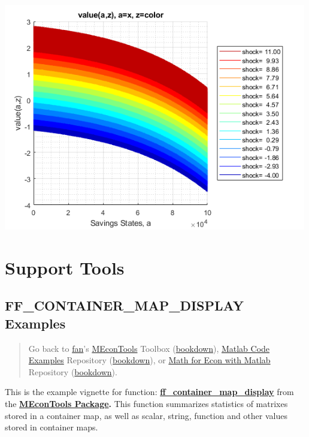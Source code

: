 \documentclass[
]{book}
\begin{document}
\includegraphics[width=5.20833in,height=\textheight]{img/fx_graph_grid_images/figure_4.png}

\hypertarget{support-tools}{%
\chapter{Support Tools}\label{support-tools}}

\hypertarget{ff_container_map_display-examples}{%
\section{FF\_CONTAINER\_MAP\_DISPLAY Examples}\label{ff_container_map_display-examples}}

\begin{quote}
Go back to \href{http://fanwangecon.github.io/}{fan}'s \href{https://fanwangecon.github.io/MEconTools/}{MEconTools} Toolbox (\href{https://fanwangecon.github.io/MEconTools/bookdown}{bookdown}), \href{https://fanwangecon.github.io/M4Econ/}{Matlab Code Examples} Repository (\href{https://fanwangecon.github.io/M4Econ/bookdown}{bookdown}), or \href{https://fanwangecon.github.io/Math4Econ/}{Math for Econ with Matlab} Repository (\href{https://fanwangecon.github.io/Math4Econ/bookdown}{bookdown}).
\end{quote}

This is the example vignette for function:
\href{https://github.com/FanWangEcon/MEconTools/blob/master/MEconTools/tools/ff_container_map_display.m}{\textbf{ff\_container\_map\_display}}
from the \href{https://fanwangecon.github.io/MEconTools/}{\textbf{MEconTools
Package}}\textbf{.} This function
summarizes statistics of matrixes stored in a container map, as well as
scalar, string, function and other values stored in container maps.
\end{document}
